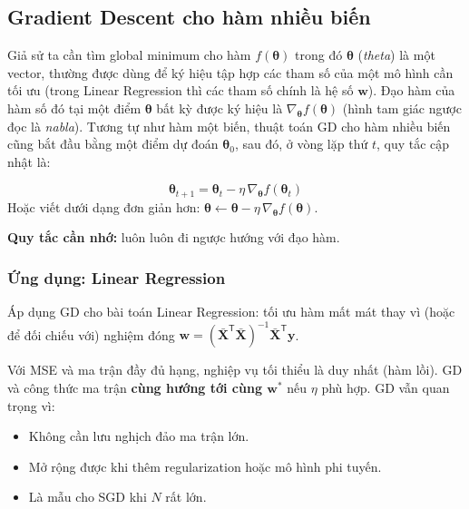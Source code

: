 \subsection{Gradient Descent cho hàm nhiều biến}

\begin{dinhnghia}[title={Cập nhật với vector tham số $\boldsymbol{\theta}$}]
Giả sử ta cần tìm global minimum cho hàm $f(\boldsymbol{\theta})$ trong đó $\boldsymbol{\theta}$ (\emph{theta}) là một vector, thường được dùng để ký hiệu tập hợp các tham số của một mô hình cần tối ưu (trong Linear Regression thì các tham số chính là hệ số $\mathbf{w}$). Đạo hàm của hàm số đó tại một điểm $\boldsymbol{\theta}$ bất kỳ được ký hiệu là $\nabla_{\boldsymbol{\theta}} f(\boldsymbol{\theta})$ (hình tam giác ngược đọc là \emph{nabla}). Tương tự như hàm một biến, thuật toán GD cho hàm nhiều biến cũng bắt đầu bằng một điểm dự đoán $\boldsymbol{\theta}_0$, sau đó, ở vòng lặp thứ $t$, quy tắc cập nhật là:
\end{dinhnghia}

\begin{congthuc}[title={Quy tắc cập nhật nhiều biến}]
\[
\boldsymbol{\theta}_{t+1} = \boldsymbol{\theta}_t - \eta\, \nabla_{\boldsymbol{\theta}} f(\boldsymbol{\theta}_t)
\]
Hoặc viết dưới dạng đơn giản hơn: $\boldsymbol{\theta} \leftarrow \boldsymbol{\theta} - \eta\, \nabla_{\boldsymbol{\theta}} f(\boldsymbol{\theta})$.

\textbf{Quy tắc cần nhớ:} luôn luôn đi ngược hướng với đạo hàm.
\end{congthuc}

\subsubsection{Ứng dụng: Linear Regression}

\begin{ynghia}[title={Tối ưu hàm mất mát Linear Regression}]
Áp dụng GD cho bài toán Linear Regression: tối ưu hàm mất mát thay vì (hoặc để đối chiếu với) nghiệm đóng $\mathbf{w} = (\bar{\mathbf{X}}^{\mathsf{T}}\bar{\mathbf{X}})^{-1}\bar{\mathbf{X}}^{\mathsf{T}}\mathbf{y}$.
\end{ynghia}

\begin{dongco}[title={GD so với nghiệm công thức}]
Với MSE và ma trận đầy đủ hạng, nghiệp vụ tối thiểu là duy nhất (hàm lồi). GD và công thức ma trận \textbf{cùng hướng tới cùng $\mathbf{w}^*$} nếu $\eta$ phù hợp. GD vẫn quan trọng vì:
\begin{itemize}
\item Không cần lưu nghịch đảo ma trận lớn.
\item Mở rộng được khi thêm regularization hoặc mô hình phi tuyến.
\item Là mẫu cho SGD khi $N$ rất lớn.
\end{itemize}
\end{dongco}

